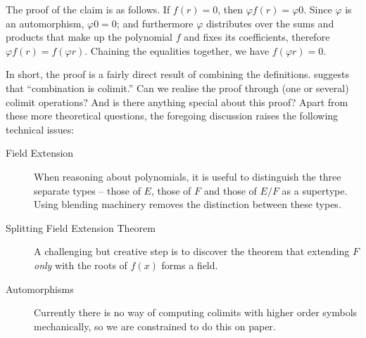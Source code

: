 The proof of the claim is as follows.  If $f(r)=0$, then $\varphi
f(r)=\varphi 0$.  Since $\varphi$ is an automorphism, $\varphi 0 = 0$;
and furthermore $\varphi$ distributes over the sums and products that
make up the polynomial $f$ and fixes its coefficients, therefore
$\varphi f(r)=f(\varphi r)$.  Chaining the equalities together, we
have $f(\varphi r)=0$.

In short, the proof is a fairly direct result of combining the
definitions.  \textcite{Goguen92sheafsemantics} suggests that
``combination is colimit.''  Can we realise the proof through (one or
several) colimit operations?  And is there anything special about this
proof?  Apart from these more theoretical questions, the foregoing
discussion raises the following technical issues:

\begin{description}
\item[Field Extension] When reasoning about polynomials, it is useful
  to distinguish the three separate types -- those of $E$, those of
  $F$ and those of $E/F$ as a supertype. Using blending machinery
  removes the distinction between these types.
\item[Splitting Field Extension Theorem] A challenging but creative
  step is to discover the theorem that extending $F$ {\em only} with
  the roots of $f(x)$ forms a field.
\item[Automorphisms] Currently there is no way of computing colimits
  with higher order symbols mechanically, so we are constrained to do
  this on paper.
\end{description}

% 

